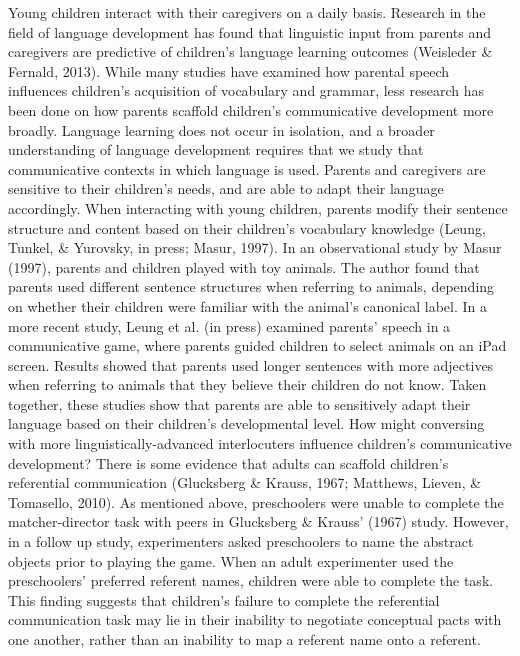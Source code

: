 \documentclass[10pt, letterpaper]{article}
\begin{document}
Young children interact with their caregivers on a daily basis. Research
in the field of language development has found that linguistic input
from parents and caregivers are predictive of children's language
learning outcomes (Weisleder \& Fernald, 2013). While many studies have
examined how parental speech influences children's acquisition of
vocabulary and grammar, less research has been done on how parents
scaffold children's communicative development more broadly. Language
learning does not occur in isolation, and a broader understanding of
language development requires that we study that communicative contexts
in which language is used. Parents and caregivers are sensitive to their
children's needs, and are able to adapt their language accordingly. When
interacting with young children, parents modify their sentence structure
and content based on their children's vocabulary knowledge (Leung,
Tunkel, \& Yurovsky, in press; Masur, 1997). In an observational study
by Masur (1997), parents and children played with toy animals. The
author found that parents used different sentence structures when
referring to animals, depending on whether their children were familiar
with the animal's canonical label. In a more recent study, Leung et al.
(in press) examined parents' speech in a communicative game, where
parents guided children to select animals on an iPad screen. Results
showed that parents used longer sentences with more adjectives when
referring to animals that they believe their children do not know. Taken
together, these studies show that parents are able to sensitively adapt
their language based on their children's developmental level. How might
conversing with more linguistically-advanced interlocuters influence
children's communicative development? There is some evidence that adults
can scaffold children's referential communication (Glucksberg \& Krauss,
1967; Matthews, Lieven, \& Tomasello, 2010). As mentioned above,
preschoolers were unable to complete the matcher-director task with
peers in Glucksberg \& Krauss' (1967) study. However, in a follow up
study, experimenters asked preschoolers to name the abstract objects
prior to playing the game. When an adult experimenter used the
preschoolers' preferred referent names, children were able to complete
the task. This finding suggests that children's failure to complete the
referential communication task may lie in their inability to negotiate
conceptual pacts with one another, rather than an inability to map a
referent name onto a referent.
\end{document}
